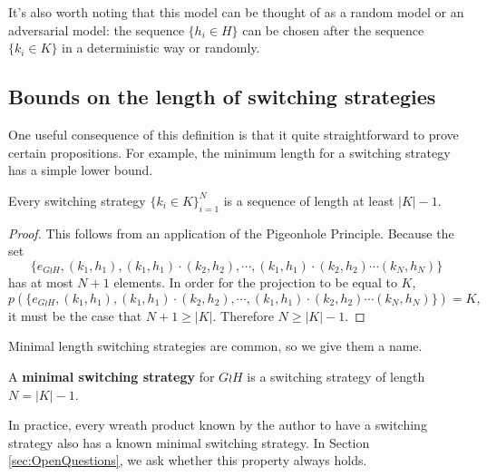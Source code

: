 It's also worth noting that this model can be thought of as a random model or an
adversarial model: the sequence $\{h_i \in H\}$ can be chosen after the sequence
$\{k_i \in K\}$ in a deterministic way or randomly.

\subsection{Bounds on the length of switching strategies}

One useful consequence of this definition is that it quite straightforward to
prove certain propositions. For example, the minimum length for a switching strategy
has a simple lower bound.
\begin{proposition}
  Every switching strategy $\{k_i \in K\}_{i=1}^{N}$ is a sequence of
  length at least ${|K| - 1}$.
\end{proposition}
\begin{proof}
  This follows from an application of the Pigeonhole Principle. Because the set \[
    \{e_{G \wr H}, (k_1, h_1), (k_1, h_1)\cdot(k_2, h_2), \cdots, (k_1, h_1)\cdot(k_2, h_2)\cdots(k_N, h_N)\}
  \] has at most $N+1$ elements. In order for the projection to be equal to $K$, \[
    p(\{e_{G \wr H}, (k_1, h_1), (k_1, h_1)\cdot(k_2, h_2), \cdots, (k_1, h_1)\cdot(k_2, h_2)\cdots(k_N, h_N)\}) = K,
  \] it must be the case that $N+1 \geq |K|$. Therefore $N \geq |K| - 1$.
\end{proof}

Minimal length switching strategies are common, so we give them a name.
\begin{definition}
  A \textbf{minimal switching strategy} for $G \wr H$ is a switching strategy
  of length $N = |K| - 1.$
\end{definition}

In practice, every wreath product known by the author to have a switching
strategy also has a known minimal switching strategy.
In Section \ref{sec:OpenQuestions}, we ask whether this property always holds.


